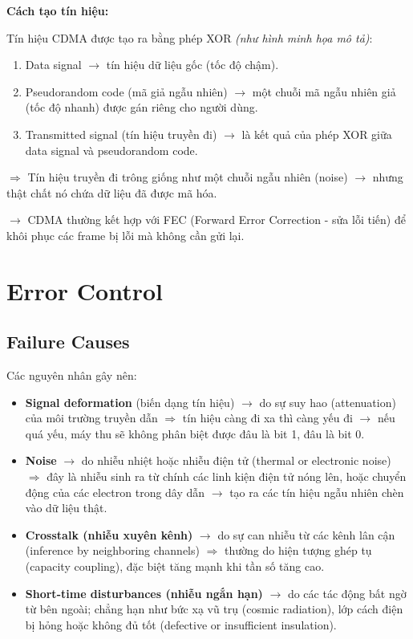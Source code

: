 \noindent
\textbf{Cách tạo tín hiệu:}

\noindent
Tín hiệu CDMA được tạo ra bằng phép XOR \textit{(như hình minh họa mô tả)}:

\begin{enumerate}
    \item Data signal $\rightarrow$ tín hiệu dữ liệu gốc (tốc độ chậm).
    \item Pseudorandom code (mã giả ngẫu nhiên) $\rightarrow$ một chuỗi mã ngẫu nhiên giả (tốc độ nhanh) được gán riêng cho người dùng.
    \item Transmitted signal (tín hiệu truyền đi) $\rightarrow$ là kết quả của phép XOR giữa data signal và pseudorandom code.
\end{enumerate}
\medskip

\noindent
$\Rightarrow$ Tín hiệu truyền đi trông giống như một chuỗi ngẫu nhiên (noise) $\rightarrow$ nhưng thật chất nó chứa dữ liệu đã được mã hóa.
\medskip

\noindent
$\rightarrow$ CDMA thường kết hợp với FEC (Forward Error Correction - sửa lỗi tiến) để khôi phục các frame bị lỗi mà không cần gửi lại.
\medskip

\section{Error Control}

\subsection{Failure Causes}

\noindent
Các nguyên nhân gây nên:

\begin{itemize}
    \item \textbf{Signal deformation} (biến dạng tín hiệu) $\rightarrow$ do sự suy hao (attenuation) của môi trường truyền dẫn $\Rightarrow$ tín hiệu càng đi xa thì càng yếu đi $\rightarrow$ nếu quá yếu, máy thu sẽ không phân biệt được đâu là bit 1, đâu là bit 0.
    \item \textbf{Noise} $\rightarrow$ do nhiễu nhiệt hoặc nhiễu điện tử (thermal or electronic noise) $\Rightarrow$ đây là nhiễu sinh ra từ chính các linh kiện điện tử nóng lên, hoặc chuyển động của các electron trong dây dẫn $\rightarrow$ tạo ra các tín hiệu ngẫu nhiên chèn vào dữ liệu thật.
    \item \textbf{Crosstalk (nhiễu xuyên kênh)} $\rightarrow$ do sự can nhiễu từ các kênh lân cận (inference by neighboring channels) $\Rightarrow$ thường do hiện tượng ghép tụ (capacity coupling), đặc biệt tăng mạnh khi tần số tăng cao.
    \item \textbf{Short-time disturbances (nhiễu ngắn hạn)} $\rightarrow$ do các tác động bất ngờ từ bên ngoài; chẳng hạn như bức xạ vũ trụ (cosmic radiation), lớp cách điện bị hỏng hoặc không đủ tốt (defective or insufficient insulation).
\end{itemize}
\medskip

